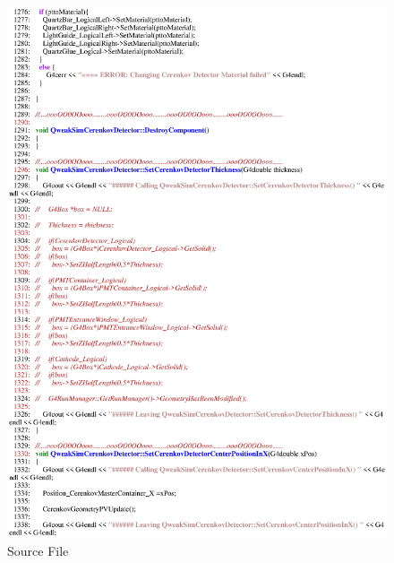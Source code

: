 \begin{figure}[ht]
  \hspace{0cm}
  \includegraphics[scale=0.8]{./figures5/QweakSimCerenkovDetector.cc-p21.eps}
  \caption{\label{SourceV21} Source File}
           \label{fig:V-SC-25}
\end{figure}
\clearpage

